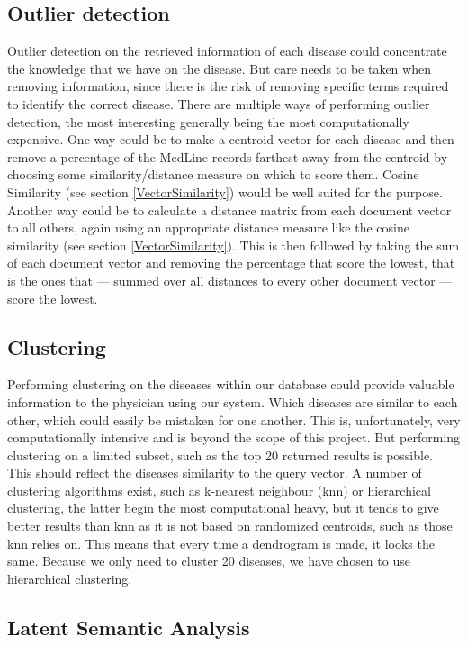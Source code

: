 \subsection{Outlier detection}

Outlier detection on the retrieved information of each disease could
concentrate the knowledge that we have on the disease. But care needs
to be taken when removing information, since there is the risk of
removing specific terms required to identify the correct
disease. There are multiple ways of performing outlier detection, the
most interesting generally being the most computationally
expensive. One way could be to make a centroid vector for each disease
and then remove a percentage of the MedLine records farthest away from
the centroid by choosing some similarity/distance measure on which to
score them. Cosine Similarity (see section \ref{VectorSimilarity})
would be well suited for the purpose. Another way could be to
calculate a distance matrix from each document vector to all others,
again using an appropriate distance measure like the cosine similarity
(see section \ref{VectorSimilarity}). This is then followed by taking
the sum of each document vector and removing the percentage that score
the lowest, that is the ones that --- summed over all distances to
every other document vector --- score the lowest. 

\subsection{Clustering}

Performing clustering on the diseases within our database could
provide valuable information to the physician using our system. Which
diseases are similar to each other, which could easily be mistaken for
one another. This is, unfortunately, very computationally intensive and
is beyond the scope of this project. But performing clustering on a
limited subset, such as the top 20 returned results is possible. This
should reflect the diseases similarity to the query vector. A number
of clustering algorithms exist, such as k-nearest neighbour (knn) or
hierarchical clustering, the latter begin the most computational
heavy, but it tends to give better results than knn as it is not based on
randomized centroids, such as those knn relies on. This means that
every time a dendrogram is made, it looks the same. Because we only
need to cluster 20 diseases, we have chosen to use hierarchical
clustering.

\subsection{Latent Semantic Analysis\label{LSA}}


